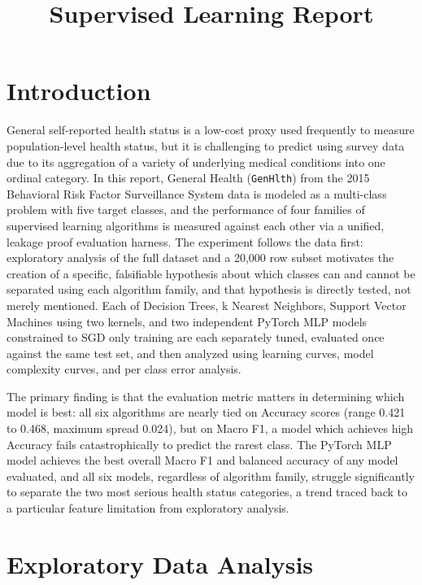 \documentclass[conference]{IEEEtran}
\begin{document}
\title{Supervised Learning Report}

\author{
}

\maketitle

\section{Introduction}

General self-reported health status is a low-cost proxy used frequently to measure population-level health status, but it is challenging to predict using survey data due to its aggregation of a variety of underlying medical conditions into one ordinal category. In this report, General Health (\texttt{GenHlth}) from the 2015 Behavioral Risk Factor Surveillance System data is modeled as a multi-class problem with five target classes, and the performance of four families of supervised learning algorithms is measured against each other via a unified, leakage proof evaluation harness. The experiment follows the data first: exploratory analysis of the full dataset and a 20{,}000 row subset motivates the creation of a specific, falsifiable hypothesis about which classes can and cannot be separated using each algorithm family, and that hypothesis is directly tested, not merely mentioned. Each of Decision Trees, k Nearest Neighbors, Support Vector Machines using two kernels, and two independent PyTorch MLP models constrained to SGD only training are each separately tuned, evaluated once against the same test set, and then analyzed using learning curves, model complexity curves, and per class error analysis.

The primary finding is that the evaluation metric matters in determining which model is best: all six algorithms are nearly tied on Accuracy scores (range 0.421 to 0.468, maximum spread 0.024), but on Macro F1, a model which achieves high Accuracy fails catastrophically to predict the rarest class. The PyTorch MLP model achieves the best overall Macro F1 and balanced accuracy of any model evaluated, and all six models, regardless of algorithm family, struggle significantly to separate the two most serious health status categories, a trend traced back to a particular feature limitation from exploratory analysis.

\section{Exploratory Data Analysis}
\end{document}
